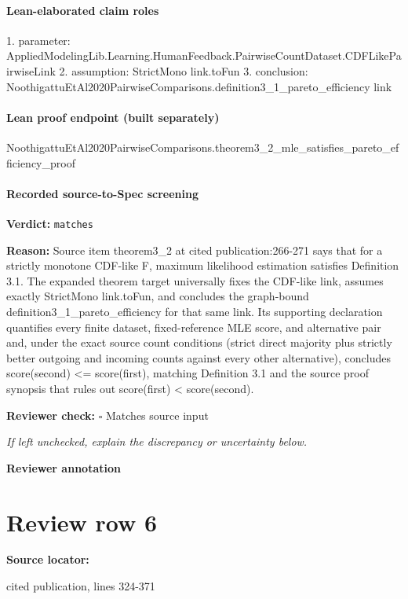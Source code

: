 \documentclass[10pt]{article}
\newcommand{\reviewerbox}{%
  \par\noindent\fbox{\parbox{0.96\linewidth}{\rule{0pt}{0.38in}}}\par
}
\newcommand{\reviewmatch}[1]{%
  \par\noindent\textbf{Reviewer check:} $\square$\; #1\par
  \noindent\emph{If left unchecked, explain the discrepancy or uncertainty below.}\par
}
\begin{document}
\paragraph{Lean-elaborated claim roles}\begin{ReviewVerbatim}
1. parameter: AppliedModelingLib.Learning.HumanFeedback.PairwiseCountDataset.CDFLikePairwiseLink
2. assumption: StrictMono link.toFun
3. conclusion: NoothigattuEtAl2020PairwiseComparisons.definition3_1_pareto_efficiency link
\end{ReviewVerbatim}

\paragraph{Lean proof endpoint (built separately)}\begin{ReviewVerbatim}
NoothigattuEtAl2020PairwiseComparisons.theorem3_2_mle_satisfies_pareto_efficiency_proof
\end{ReviewVerbatim}

\paragraph{Recorded source-to-Spec screening}
\textbf{Verdict:} \texttt{matches}
\\
{\raggedright
\textbf{Reason:} Source item theorem3\_\allowbreak{}2 at cited publication:\allowbreak{}266-\allowbreak{}271 says that for a strictly monotone CDF-\allowbreak{}like F, maximum likelihood estimation satisfies Definition 3.\allowbreak{}1.\allowbreak{} The expanded theorem target universally fixes the CDF-\allowbreak{}like link, assumes exactly StrictMono link.\allowbreak{}toFun, and concludes the graph-\allowbreak{}bound definition3\_\allowbreak{}1\_\allowbreak{}pareto\_\allowbreak{}efficiency for that same link.\allowbreak{} Its supporting declaration quantifies every finite dataset, fixed-\allowbreak{}reference MLE score, and alternative pair and, under the exact source count conditions (strict direct majority plus strictly better outgoing and incoming counts against every other alternative), concludes score(second) <= score(first), matching Definition 3.\allowbreak{}1 and the source proof synopsis that rules out score(first) < score(second).\allowbreak{}
\par}
\reviewmatch{Matches source input}
\noindent\textbf{Reviewer annotation}\par
\reviewerbox
\clearpage
\hypertarget{source-claim-edf2d1637af168b9}{}
\section*{Review row 6}
\textbf{Source locator:} {\footnotesize\raggedright cited publication, lines 324-\allowbreak{}371\par}
\end{document}
